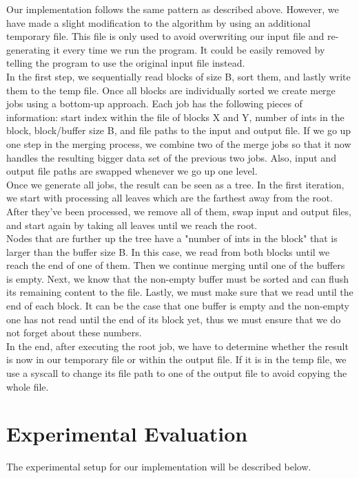 \documentclass[twocolumn]{article}
\begin{document}
Our implementation follows the same pattern as described above.
However, we have made a slight modification to the algorithm by using an additional temporary file. This file is only used to avoid overwriting our input file and re-generating it every time we run the program. It could be easily removed by telling the program to use the original input file instead.\\
In the first step, we sequentially read blocks of size B, sort them, and lastly write them to the temp file. Once all blocks are individually sorted we create merge jobs using a bottom-up approach. Each job has the following pieces of information: start index within the file of blocks X and Y, number of ints in the block, block/buffer size B, and file paths to the input and output file. If we go up one step in the merging process, we combine two of the merge jobs so that it now handles the resulting bigger data set of the previous two jobs. Also, input and output file paths are swapped whenever we go up one level.\\
Once we generate all jobs, the result can be seen as a tree. In the first iteration, we start with processing all leaves which are the farthest away from the root. After they've been processed, we remove all of them, swap input and output files, and start again by taking all leaves until we reach the root.\\
Nodes that are further up the tree have a "number of ints in the block" that is larger than the buffer size B. In this case, we read from both blocks until we reach the end of one of them. Then we continue merging until one of the buffers is empty. Next, we know that the non-empty buffer must be sorted and can flush its remaining content to the file. Lastly, we must make sure that we read until the end of each block. It can be the case that one buffer is empty and the non-empty one has not read until the end of its block yet, thus we must ensure that we do not forget about these numbers.\\
In the end, after executing the root job, we have to determine whether the result is now in our temporary file or within the output file. If it is in the temp file, we use a syscall to change its file path to one of the output file to avoid copying the whole file. 



\section{Experimental Evaluation}
The experimental setup for our implementation will be described below.
\end{document}
